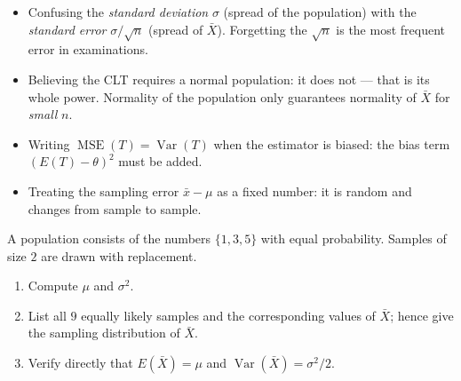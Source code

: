 \documentclass[11pt]{article}
\begin{document}
\begin{attention}
\begin{itemize}
\item Confusing the \emph{standard deviation} $\sigma$ (spread of the population) with the \emph{standard error} $\sigma/\sqrt{n}$ (spread of $\bar{X}$). Forgetting the $\sqrt{n}$ is the most frequent error in examinations.
\item Believing the CLT requires a normal population: it does not — that is its whole power. Normality of the population only guarantees normality of $\bar{X}$ for \emph{small} $n$.
\item Writing $\operatorname{MSE}(T) = \operatorname{Var}(T)$ when the estimator is biased: the bias term $(E(T)-\theta)^2$ must be added.
\item Treating the sampling error $\bar{x} - \mu$ as a fixed number: it is random and changes from sample to sample.
\end{itemize}
\end{attention}

\begin{exercice}
A population consists of the numbers $\{1, 3, 5\}$ with equal probability. Samples of size $2$ are drawn with replacement.
\begin{enumerate}
\item Compute $\mu$ and $\sigma^2$.
\item List all $9$ equally likely samples and the corresponding values of $\bar{X}$; hence give the sampling distribution of $\bar{X}$.
\item Verify directly that $E(\bar{X}) = \mu$ and $\operatorname{Var}(\bar{X}) = \sigma^2/2$.
\end{enumerate}
\end{exercice}
\end{document}
